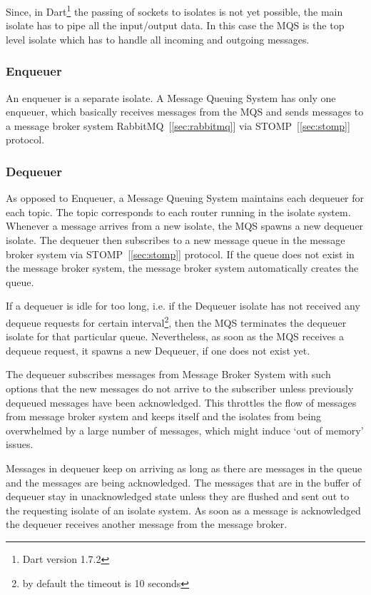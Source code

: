 Since, in Dart\footnote{Dart version 1.7.2} the passing of sockets to isolates is not yet possible, the main isolate has to pipe all the input/output data. In this case the MQS is the top level isolate which has to handle all incoming and outgoing messages.

  \subsubsection{Enqueuer}
  An enqueuer is a separate isolate. A Message Queuing System has only one enqueuer, which basically receives messages from the MQS and sends messages to a message broker system \textendash{} RabbitMQ~[\ref{sec:rabbitmq}] via STOMP~[\ref{sec:stomp}] protocol.

  \subsubsection{Dequeuer}
  As opposed to Enqueuer, a Message Queuing System maintains each dequeuer for each topic. The topic corresponds to each router running in the isolate system. Whenever a message arrives from a new isolate, the MQS spawns a new dequeuer isolate. The dequeuer then subscribes to a new message queue in the message broker system via STOMP~[\ref{sec:stomp}] protocol. If the queue does not exist in the message broker system, the message broker system automatically creates the queue.

  If a dequeuer is idle for too long, i.e. if the Dequeuer isolate has not received any dequeue requests for certain interval\footnote{by default the timeout is 10 seconds}, then the MQS terminates the dequeuer isolate for that particular queue. Nevertheless, as soon as the MQS receives a dequeue request, it spawns a new Dequeuer, if one does not exist yet.

  The dequeuer subscribes messages from Message Broker System with such options that the new messages do not arrive to the subscriber unless previously dequeued messages have been acknowledged. This throttles the flow of messages from message broker system and keeps itself and the isolates from being overwhelmed by a large number of messages, which might induce ‘out of memory’ issues.

  Messages in dequeuer keep on arriving as long as there are messages in the queue and the messages are being acknowledged. The messages that are in the buffer of dequeuer stay in unacknowledged state unless they are flushed and sent out to the requesting isolate of an isolate system. As soon as a message is acknowledged the dequeuer receives another message from the message broker.

